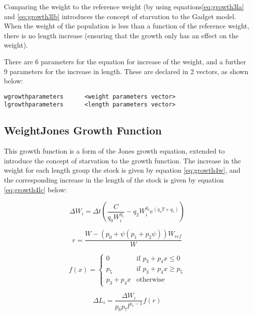 \documentclass[]{book}
\begin{document}
Comparing the weight to the reference weight (by using
equations\eqref{eq:growth3la} and
\eqref{eq:growth3lb} introduces the concept of starvation to the
Gadget model. When the weight of the population is less than a function
of the reference weight, there is no length increase (ensuring that the
growth only has an effect on the weight).

There are 6 parameters for the equation for increase of the weight, and
a further 9 parameters for the increase in length. These are declared in
2 vectors, as shown below:

\begin{verbatim}
wgrowthparameters      <weight parameters vector>
lgrowthparameters      <length parameters vector>
\end{verbatim}

\hypertarget{subsec:growth4}{%
\subsection{WeightJones Growth Function}\label{subsec:growth4}}

This growth function is a form of the Jones growth equation, extended to
introduce the concept of starvation to the growth function. The increase
in the weight for each length group the stock is given by
equation \eqref{eq:growth4w}, and the corresponding increase in the length
of the stock is given by
equation \eqref{eq:growth4lc} below:

\begin{equation}
\label{eq:growth4w}
\Delta W_{i} = \Delta t \left( \frac{C}{q_{0} W_{i}^{q_{1}}} - q_{2} W_{i}^{q_{3}} e^{(q_{4} T + q_{5})} \right)\end{equation}

\begin{equation}
\label{eq:growth4la}
r = \frac{W - \left( p_{0} + \psi \left( p_{1} + p_{2}\psi \right) \right) W_{ref}}{W}\end{equation}

\begin{equation}
\label{eq:growth4lb}
f(x) =
\begin{cases}
0 & \textrm{if $p_{3} + p_{4}x \leq 0$} \\
p_{5} & \textrm{if $p_{3} + p_{4}x \geq p_{5}$} \\
p_{3} + p_{4}x & \textrm{otherwise}
\end{cases}\end{equation}

\begin{equation}
\label{eq:growth4lc}
\Delta L_{i} = \frac{\Delta W_{i}} {p_{6} p_{7} l^{p_{7} - 1}} f(r)\end{equation}
\end{document}
